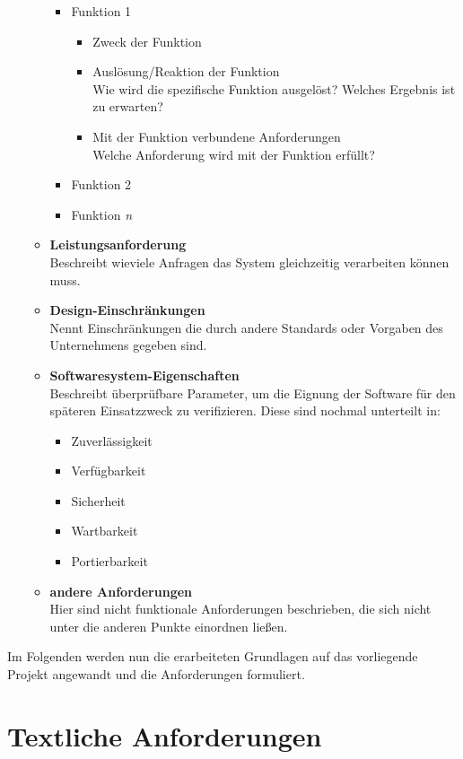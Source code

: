 \begin{itemize}
\begin{itemize}
		\begin{itemize}
			\item Funktion 1
			\begin{itemize}
				\item Zweck der Funktion
				\item Auslösung/Reaktion der Funktion \\
				Wie wird die spezifische Funktion ausgelöst? Welches Ergebnis ist zu erwarten?
				\item Mit der Funktion verbundene Anforderungen\\
				Welche Anforderung wird mit der Funktion erfüllt?
			\end{itemize}
			\item Funktion 2
			\item Funktion \textit{n}
		\end{itemize}
	\item \textbf{Leistungsanforderung} \\
	Beschreibt \zb wieviele  Anfragen das System gleichzeitig verarbeiten können muss.
	\item \textbf{Design-Einschränkungen} \\
	Nennt Einschränkungen die durch andere Standards oder Vorgaben des Unternehmens gegeben sind.
	\item \textbf{Softwaresystem-Eigenschaften} \\
	Beschreibt überprüfbare Parameter, um die Eignung der Software für den späteren Einsatzzweck zu verifizieren. Diese sind nochmal unterteilt in:
	\begin{itemize}
		\item Zuverlässigkeit
		\item Verfügbarkeit
		\item Sicherheit
		\item Wartbarkeit
		\item Portierbarkeit
	\end{itemize} 
	\item \textbf{andere Anforderungen} \\
	Hier sind nicht funktionale Anforderungen beschrieben, die sich nicht unter die anderen Punkte einordnen ließen.
	\end{itemize}

\end{itemize}

Im Folgenden werden nun die erarbeiteten Grundlagen auf das vorliegende Projekt angewandt und die Anforderungen formuliert. 

\section{Textliche Anforderungen}
\label{sec:textAnf}

